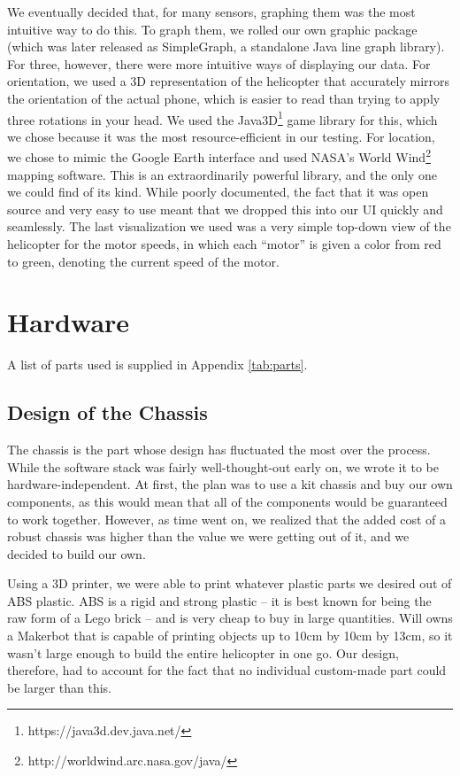 We eventually decided that, for many sensors, graphing them was the
most intuitive way to do this. To graph them, we rolled our own
graphic package (which was later released as SimpleGraph, a standalone
Java line graph library). For three, however, there were more
intuitive ways of displaying our data. For orientation, we used a 3D
representation of the helicopter that accurately mirrors the
orientation of the actual phone, which is easier to read than trying
to apply three rotations in your head. We used the
Java3D\footnote{https://java3d.dev.java.net/} game library for this,
which we chose because it was the most resource-efficient in our
testing. For location, we chose to mimic the Google Earth interface
and used NASA's World
Wind\footnote{http://worldwind.arc.nasa.gov/java/} mapping
software. This is an extraordinarily powerful library, and the only
one we could find of its kind. While poorly documented, the fact that
it was open source and very easy to use meant that we dropped this
into our UI quickly and seamlessly. The last visualization we used was
a very simple top-down view of the helicopter for the motor speeds, in
which each ``motor'' is given a color from red to green, denoting the
current speed of the motor.

\section{Hardware}
A list of parts used is supplied in Appendix \ref{tab:parts}.

\subsection{Design of the Chassis}
The chassis is the part whose design has fluctuated the most over the
process. While the software stack was fairly well-thought-out early
on, we wrote it to be hardware-independent. At first, the plan was to
use a kit chassis and buy our own components, as this would mean that
all of the components would be guaranteed to work together. However,
as time went on, we realized that the added cost of a robust chassis
was higher than the value we were getting out of it, and we decided to
build our own.

Using a 3D printer, we were able to print whatever plastic parts we
desired out of ABS plastic. ABS is a rigid and strong plastic -- it is
best known for being the raw form of a Lego brick -- and is very cheap
to buy in large quantities. Will owns a Makerbot that is capable of
printing objects up to 10cm by 10cm by 13cm, so it wasn't large enough
to build the entire helicopter in one go. Our design, therefore, had
to account for the fact that no individual custom-made part could be
larger than this.

